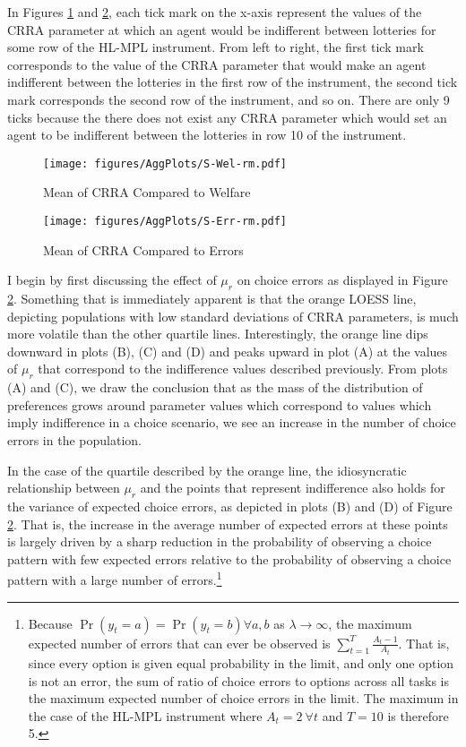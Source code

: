 \documentclass[../main.tex]{subfiles}
\begin{document}
In Figures \ref{fig:S-Wel-rm} and \ref{fig:S-Err-rm}, each tick mark on the x-axis represent the values of the CRRA parameter at which an agent would be indifferent between lotteries for some row of the HL-MPL instrument.
From left to right, the first tick mark corresponds to the value of the CRRA parameter that would make an agent indifferent between the lotteries in the first row of the instrument, the second tick mark corresponds the second row of the instrument, and so on.
There are only 9 ticks because the there does not exist any CRRA parameter which would set an agent to be indifferent between the lotteries in row 10 of the instrument.

\begin{figure}[h!]
	\center
	\caption{Mean of CRRA Compared to Welfare}
	\texttt{[image: figures/AggPlots/S-Wel-rm.pdf]}
	\label{fig:S-Wel-rm}
\end{figure}

\begin{figure}[h!]
	\center
	\caption{Mean of CRRA Compared to Errors}
	\texttt{[image: figures/AggPlots/S-Err-rm.pdf]}
	\label{fig:S-Err-rm}
\end{figure}

I begin by first discussing the effect of $\mu_r$ on choice errors as displayed in Figure \ref{fig:S-Err-rm}.
Something that is immediately apparent is that the orange LOESS line, depicting populations with low standard deviations of CRRA parameters, is much more volatile than the other quartile lines.
Interestingly, the orange line dips downward in plots (B), (C) and (D) and peaks upward in plot (A) at the values of $\mu_r$ that correspond to the indifference values described previously.
From plots (A) and (C), we draw the conclusion that as the mass of the distribution of preferences grows around parameter values which correspond to values which imply indifference in a choice scenario, we see an increase in the number of choice errors in the population.

In the case of the quartile described by the orange line, the idiosyncratic relationship between $\mu_r$ and the points that represent indifference also holds for the variance of expected choice errors, as depicted in plots (B) and (D) of Figure \ref{fig:S-Err-rm}.
That is, the increase in the average number of expected errors at these points is largely driven by a sharp reduction in the probability of observing a choice pattern with few expected errors relative to the probability of observing a choice pattern with a large number of errors.\footnote{
	Because $\Pr(y_t=a) = \Pr(y_t=b) \forall a,b$ as $\lambda \to \infty$, the maximum expected number of errors that can ever be observed is $\sum_{t=1}^T \frac{A_t -1}{A_t}$.
	That is, since every option is given equal probability in the limit, and only one option is not an error, the sum of ratio of choice errors to options across all tasks is the maximum expected number of choice errors in the limit.
	The maximum in the case of the HL-MPL instrument where $A_t = 2 \ \forall t$ and $T=10$ is therefore 5.
}
\end{document}
